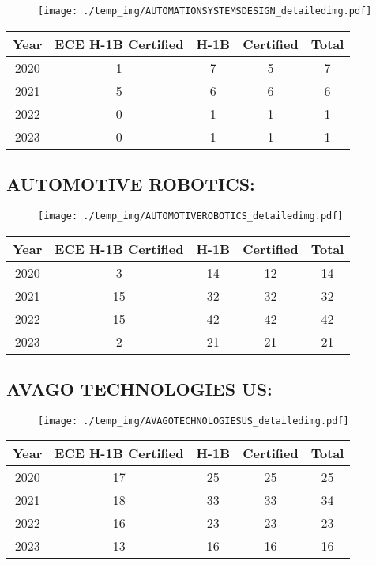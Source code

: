 \documentclass{article}%
\begin{document}
\begin{figure}[htbp]%
\centering%
\texttt{[image: ./temp\_img/AUTOMATIONSYSTEMSDESIGN\_detailedimg.pdf]}%
\end{figure}

%
\begin{longtable}{c|c|c|c|c}%
\hline%
Year&ECE H{-}1B Certified&H{-}1B&Certified&Total\\%
\hline%
2020&1&7&5&7\\%
\hline%
2021&5&6&6&6\\%
\hline%
2022&0&1&1&1\\%
\hline%
2023&0&1&1&1\\%
\hline%
\end{longtable}

%
\newpage%
\subsection{AUTOMOTIVE ROBOTICS:}%
\label{subsec:AUTOMOTIVEROBOTICS}%
\label{AUTOMOTIVEROBOTICSdetailed}%


\begin{figure}[htbp]%
\centering%
\texttt{[image: ./temp\_img/AUTOMOTIVEROBOTICS\_detailedimg.pdf]}%
\end{figure}

%
\begin{longtable}{c|c|c|c|c}%
\hline%
Year&ECE H{-}1B Certified&H{-}1B&Certified&Total\\%
\hline%
2020&3&14&12&14\\%
\hline%
2021&15&32&32&32\\%
\hline%
2022&15&42&42&42\\%
\hline%
2023&2&21&21&21\\%
\hline%
\end{longtable}

%
\newpage%
\subsection{AVAGO TECHNOLOGIES US:}%
\label{subsec:AVAGOTECHNOLOGIESUS}%
\label{AVAGOTECHNOLOGIESUSdetailed}%


\begin{figure}[htbp]%
\centering%
\texttt{[image: ./temp\_img/AVAGOTECHNOLOGIESUS\_detailedimg.pdf]}%
\end{figure}

%
\begin{longtable}{c|c|c|c|c}%
\hline%
Year&ECE H{-}1B Certified&H{-}1B&Certified&Total\\%
\hline%
2020&17&25&25&25\\%
\hline%
2021&18&33&33&34\\%
\hline%
2022&16&23&23&23\\%
\hline%
2023&13&16&16&16\\%
\hline%
\end{longtable}
\end{document}
